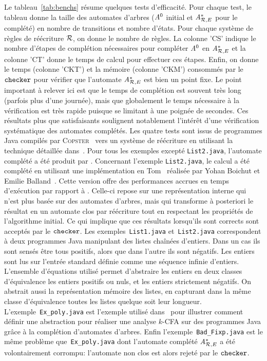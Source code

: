 Le tableau~\ref{tab:benchs} résume quelques tests
d'efficacité. Pour chaque test, le tableau donne la taille des automates d'arbres 
($\mathit A^0$ initial et ${\mathit A}_{\mathcal R,E}^*$ pour le complété) en nombre de transitions et nombre d'états.
Pour chaque système de règles de réécriture $\mathcal R$, on donne le nombre de règles.
La colonne 'CS' indique le nombre d'étapes de complétion nécessaires pour compléter
$\mathit A^0$ en ${\mathit A}_{\mathcal R,E}^*$ et la colonne 'CT' donne le temps de calcul pour effectuer ces étapes.
Enfin, on donne le temps (colonne 'CKT') et la mémoire (colonne 'CKM') consommés par le $\mathtt{checker}$
pour vérifier que l'automate ${\mathit A}_{\mathcal R,E}^*$ est bien un point fixe.
Le point important à relever ici est que le temps de complétion est souvent très long 
(parfois plus d'une journée), mais que globalement le temps nécessaire à la vérification
est très rapide puisque se limitant à une poignée de secondes. Ces résultats plus que
satisfaisants soulignent notablement l'intérêt d'une vérification systématique des automates
complétés.
Les quatre tests sont issus de programmes Java compilés par \textsc{Copster}~\cite{Copster}
vers un système de réécriture en utilisant la technique détaillée dans~\cite{BoichutGJL-RTA07}.
Pour tous les exemples excepté \texttt{List2.java}, l'automate complété a été produit par \timbuk.
Concernant l'exemple \texttt{List2.java}, le calcul a été complété en utilisant 
une implémentation en Tom~\cite{TOM} réalisée par Yohan Boichut et Emilie Balland~\cite{BallandBGM-AMAST08}.
Cette version offre des performances accrues en temps d'exécution par rapport à \timbuk. Celle-ci repose
sur une représentation interne qui n'est plus basée sur des automates d'arbres, mais qui transforme 
à posteriori le résultat en un automate clos par réécriture tout en respectant les propriétés de l'algorithme
initial. Ce qui implique que ces résultats lorsqu'ils sont corrects sont acceptés par le $\mathtt{checker}$.
Les exemples~\texttt{List1.java} et~\texttt{List2.java} correspondent à deux programmes Java 
manipulant des listes chaînées d'entiers. Dans un cas ils sont sensés être tous positifs,
alors que dans l'autre ils sont négatifs. Les entiers sont lus sur l'entrée standard définie
comme une séquence infinie d'entiers. L'ensemble d'équations utilisé permet d'abstraire les entiers 
en deux classes d'équivalence les entiers positifs ou nuls, et les entiers strictement négatifs. On abstrait aussi
la représentation mémoire des listes, en capturant dans la même classe d'équivalence toutes les listes quelque 
soit leur longueur.
L'exemple~\texttt{Ex\_poly.java} est l'exemple utilisé dans~\cite{BoichutGJL-RTA07} 
pour illustrer comment définir une abstraction pour réaliser 
une analyse $k$-CFA sur des programmes Java grâce à la complétion d'automates d'arbres.
Enfin l'exemple~\texttt{Bad\_Fixp.java} est le même problème que~\texttt{Ex\_poly.java} dont l'automate
complété ${\mathit A}_{\mathcal R,E}^*$ a été volontairement corrompu: l'automate non clos est alors rejeté
par le $\mathtt{checker}$.

